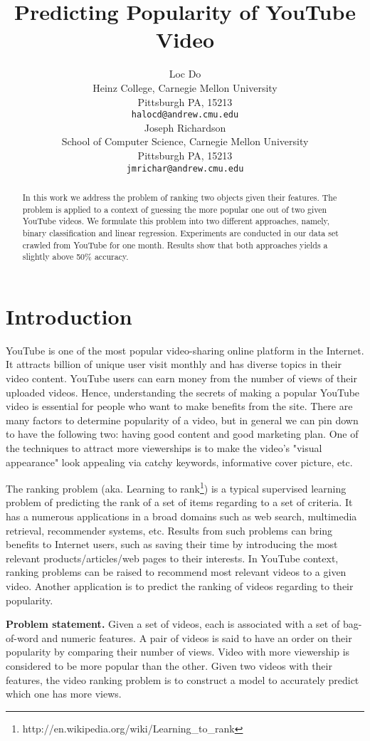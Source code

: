 \documentclass{article} %
\title{Predicting Popularity of YouTube Video}
\author{
Loc Do \\
Heinz College,
Carnegie Mellon University \\
Pittsburgh PA, 15213\\
\texttt{halocd@andrew.cmu.edu} \\
\And
Joseph Richardson \\
School of Computer Science,
Carnegie Mellon University \\
Pittsburgh PA, 15213 \\
\texttt{jmrichar@andrew.cmu.edu} \\
}
\begin{document}
\maketitle

\begin{abstract}
	In this work we address the problem of ranking two objects given their features. The problem is applied to a context of guessing the more popular one out of two given YouTube videos. We formulate this problem into two different approaches, namely, binary classification and linear regression. Experiments are conducted in our data set crawled from YouTube for one month. Results show that both approaches yields a slightly above 50\% accuracy.
\end{abstract}

\section{Introduction}
\label{sec:intro}
	YouTube is one of the most popular video-sharing online platform in the Internet. It attracts billion of unique user visit monthly and has diverse topics in their video content. YouTube users can earn money from the number of views of their uploaded videos. Hence, understanding the secrets of making a popular YouTube video is essential for people who want to make benefits from the site. There are many factors to determine popularity of a video, but in general we can pin down to have the following two: having good content and good marketing plan. One of the techniques to attract more viewerships is to make the video's "visual appearance" look appealing via catchy keywords, informative cover picture, etc.

	The ranking problem (aka. Learning to rank\footnote{http://en.wikipedia.org/wiki/Learning\_to\_rank}) is a typical supervised learning problem of predicting the rank of a set of items regarding to a set of criteria. It has a numerous applications in a broad domains such as web search, multimedia retrieval, recommender systems, etc. Results from such problems can bring benefits to Internet users, such as saving their time by introducing the most relevant products/articles/web pages to their interests. In YouTube context, ranking problems can be raised to recommend most relevant videos to a given video. Another application is to predict the ranking of videos regarding to their popularity.

	\textbf{Problem statement.} Given a set of videos, each is associated with a set of bag-of-word and numeric features. A pair of videos is said to have an order on their popularity by comparing their number of views. Video with more viewership is considered to be more popular than the other. Given two videos with their features, the video ranking problem is to construct a model to accurately predict which one has more views.
\end{document}
